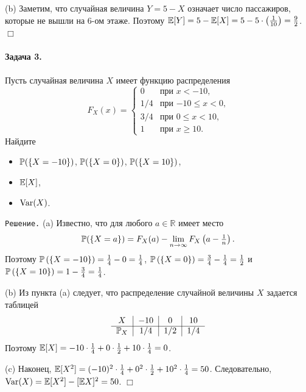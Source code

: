 \documentclass[12pt, a4paper]{article}\usepackage[]{graphicx}\usepackage[]{color}
\begin{document}
(b) Заметим, что случайная величина $Y = 5 - X$ означает число пассажиров, которые не вышли на 6-ом этаже. Поэтому $\E[Y] = 5 - \E[X] = 5 - 5\cdot\left(\tfrac{1}{10}\right) = \tfrac{9}{2}$. $\Box$
\paragraph{Задача 3.}
Пусть случайная величина $X$ имеет функцию распределения
\[
F_X(x) =          \begin{cases}
                     0     &   \text{при $x < -10$,} \\
                     1/4   &   \text{при $-10 \leq x < 0$,} \\
                     3/4   &   \text{при $0 \leq x < 10$,} \\
                     1     &   \text{при $x \geq 10$.}
                  \end{cases}
\]
Найдите
\begin{itemize}
  \item[(a)] $\P(\{X=-10\})$, $\P(\{X=0\})$, $\P(\{X=10\})$,
  \item[(b)] $\E[X]$,
  \item[(c)] $\Var(X)$.
\end{itemize}

\verb"Решение." (a) Известно, что для любого $a \in \mathbb{R}$ имеет место
\[
\P(\{X=a\}) = F_X(a) - \lim_{n \rightarrow \infty}F_X\left(a-\tfrac{1}{n}\right) \text{.}
\]
Поэтому $\P\left(\{X=-10\}\right) = \frac{1}{4} - 0 = \frac{1}{4}$, $\P\left(\{X=0\}\right) = \frac{3}{4} - \frac{1}{4} = \frac{1}{2}$ и $\P\left(\{X=10\}\right) = 1 - \frac{3}{4} = \frac{1}{4}$.

(b) Из пункта (a) следует, что распределение случайной величины $X$ задается таблицей
\[
\begin{tabular}{c|c|c|c}
  $X$             & $-10$   & $0$     & $10$ \\ \cline{1-4}
  $\P_X$  & $1/4$   & $1/2$   & $1/4$ \\
\end{tabular}
\]
Поэтому $\E[X] = -10 \cdot \frac{1}{4} + 0 \cdot \frac{1}{2} + 10 \cdot \frac{1}{4} = 0$.

(c) Наконец, $\E[X^2] = (-10)^2 \cdot \frac{1}{4} + 0^2 \cdot \frac{1}{2} + 10^2 \cdot \frac{1}{4} = 50$. Следовательно, $\Var(X) = \E[X^2] - [\E X]^2 = 50$. $\Box$
\end{document}
